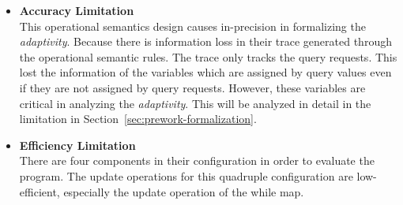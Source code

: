 {\begin{itemize}
\begin{enumerate}
    able to be decided during executing this while loop body.
    This program represents a class of data analysis programs with non-constant loop iterations
    which is very common in data analysis. However, it isn't supported by their design.
    \end{enumerate}
 \item \textbf{Accuracy Limitation}
 \\
 This operational semantics design causes in-precision in formalizing the \emph{adaptivity}.
 Because there is information loss in their trace generated through the operational semantic rules.
 The trace only tracks the query requests. This lost the information of the variables
 which are assigned by query values even if they are not assigned by query requests. However, these variables
 are critical in analyzing the \emph{adaptivity}.
 This will be analyzed in detail in the limitation in Section~\ref{sec:prework-formalization}.
 \item \textbf{Efficiency Limitation}
 \\
 There are four components in their configuration in order to evaluate the program. 
 The update operations for this quadruple configuration are low-efficient, especially the update operation of the while map.
\end{itemize}
}  

